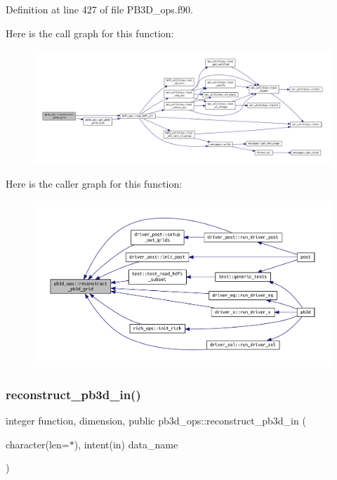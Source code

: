 Definition at line 427 of file P\+B3\+D\+\_\+ops.\+f90.

Here is the call graph for this function\+:
\nopagebreak
\begin{figure}[H]
\begin{center}
\leavevmode
\includegraphics[width=350pt]{namespacepb3d__ops_a279af758fa95e678f6485c50e5bc4ffb_cgraph}
\end{center}
\end{figure}
Here is the caller graph for this function\+:
\nopagebreak
\begin{figure}[H]
\begin{center}
\leavevmode
\includegraphics[width=350pt]{namespacepb3d__ops_a279af758fa95e678f6485c50e5bc4ffb_icgraph}
\end{center}
\end{figure}
\mbox{\label{namespacepb3d__ops_a057fc02a2d90e9ac8a7e5764d83fd1df}} 
\subsubsection{\texorpdfstring{reconstruct\+\_\+pb3d\+\_\+in()}{reconstruct\_pb3d\_in()}}
{\footnotesize\ttfamily integer function, dimension, public pb3d\+\_\+ops\+::reconstruct\+\_\+pb3d\+\_\+in (\begin{DoxyParamCaption}\item[{character(len=$\ast$), intent(in)}]{data\+\_\+name }\end{DoxyParamCaption})}



